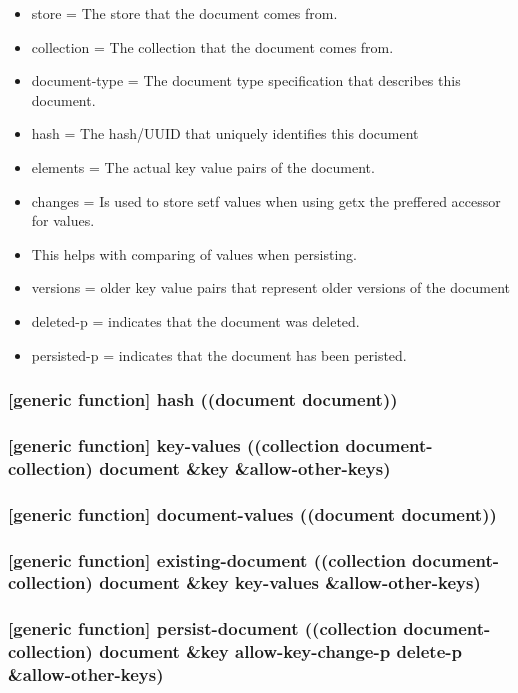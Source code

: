 \documentclass[11pt]{article}
\begin{document}
\begin{itemize}
\item store = The store that the document comes from.
\item collection = The collection that the document comes from.
\item document-type = The document type specification that describes this document.
\item hash = The hash/UUID that uniquely identifies this document
\item elements = The actual key value pairs of the document.
\item changes = Is used to store setf values when using getx the preffered accessor for values.
\item This helps with comparing of values when persisting.
\item versions = older key value pairs that represent older versions of the document
\item deleted-p = indicates that the document was deleted.
\item persisted-p = indicates that the document has been peristed.
\end{itemize}

\subsubsection{[generic function] hash ((document document))}
\label{sec:org33e75df}

\subsubsection{[generic function] key-values ((collection document-collection) document \&key \&allow-other-keys)}
\label{sec:orgd08b6fb}

\subsubsection{[generic function] document-values ((document document))}
\label{sec:orged54568}

\subsubsection{[generic function] existing-document ((collection document-collection) document \&key key-values \&allow-other-keys)}
\label{sec:orgc0aaf55}

\subsubsection{[generic function] persist-document ((collection document-collection) document \&key allow-key-change-p delete-p \&allow-other-keys)}
\label{sec:org4a98a89}
\end{document}
